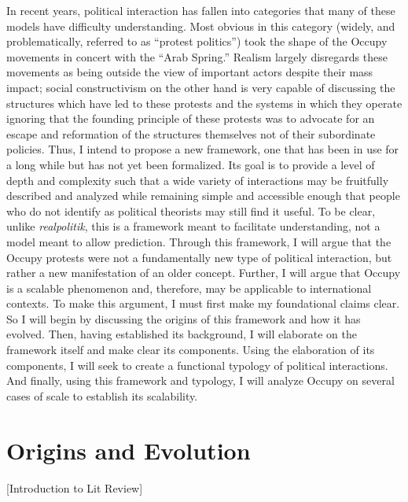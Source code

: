 \documentclass{article}
\begin{document}
In recent years, political interaction has fallen into categories that many of these models have difficulty understanding. 
Most obvious in this category (widely, and problematically, referred to as ``protest politics'') took the shape of the Occupy movements in concert with the ``Arab Spring.'' 
Realism largely disregards these movements as being outside the view of important actors despite their mass impact; social constructivism on the other hand is very capable of discussing the structures which have led to these protests and the systems in which they operate ignoring that the founding principle of these protests was to advocate for an escape and reformation of the structures themselves not of their subordinate policies. 
Thus, I intend to propose a new framework, one that has been in use for a long while but has not yet been formalized. 
Its goal is to provide a level of depth and complexity such that a wide variety of interactions may be fruitfully described and analyzed while remaining simple and accessible enough that people who do not identify as political theorists may still find it useful. 
To be clear, unlike \textit{realpolitik}, this is a framework meant to facilitate understanding, not a model meant to allow prediction. 
Through this framework, I will argue that the Occupy protests were not a fundamentally new type of political interaction, but rather a new manifestation of an older concept. 
Further, I will argue that Occupy is a scalable phenomenon and, therefore, may be applicable to international contexts. 
To make this argument, I must first make my foundational claims clear. 
So I will begin by discussing the origins of this framework and how it has evolved. 
Then, having established its background, I will elaborate on the framework itself and make clear its components. 
Using the elaboration of its components, I will seek to create a functional typology of political interactions. 
And finally, using this framework and typology, I will analyze Occupy on several cases of scale to establish its scalability.

\section{Origins and Evolution}
\label{sec:origins}
[Introduction to Lit Review]
\end{document}
